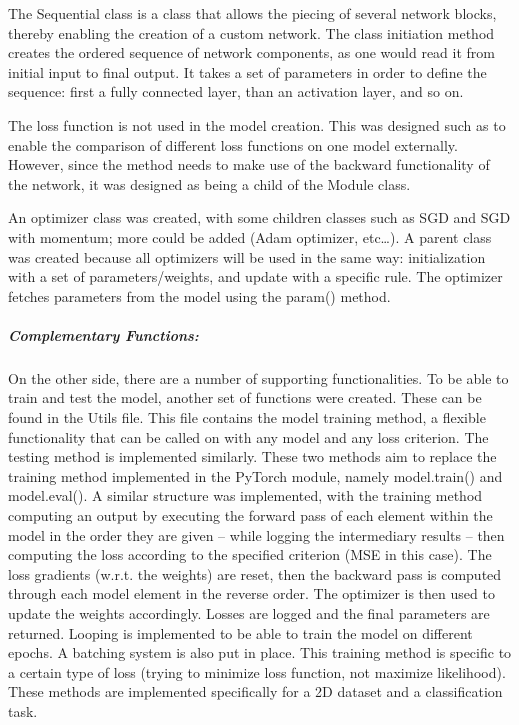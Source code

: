 \documentclass[10pt, a4paper]{article}
\begin{document}
The Sequential class is a class that allows the piecing of several network blocks, thereby enabling the creation of a custom network. The class initiation method creates the ordered sequence of network components, as one would read it from initial input to final output. It takes a set of parameters in order to define the sequence: first a fully connected layer, than an activation layer, and so on.

The loss function is not used in the model creation. This was designed such as to enable the comparison of different loss functions on one model externally. However, since the method needs to make use of the backward functionality of the network, it was designed as being a child of the Module class.

An optimizer class was created, with some children classes such as SGD and SGD with momentum; more could be added (Adam optimizer, etc…). A parent class was created because all optimizers will be used in the same way: initialization with a set of parameters/weights, and update with a specific rule. The optimizer fetches parameters from the model using the param() method.


\subparagraph{Complementary Functions:}
On the other side, there are a number of supporting functionalities. To be able to train and test the model, another set of functions were created. These can be found in the Utils file. This file contains the model training method, a flexible functionality that can be called on with any model and any loss criterion. The testing method is implemented similarly. These two methods aim to replace the training method implemented in the PyTorch module, namely model.train() and model.eval(). A similar structure was implemented, with the training method computing an output by executing the forward pass of each element within the model in the order they are given -- while logging the intermediary results -- then computing the loss according to the specified criterion (MSE in this case). The loss gradients (w.r.t. the weights) are reset, then the backward pass is computed through each model element in the reverse order. The optimizer is then used to update the weights accordingly. Losses are logged and the final parameters are returned. Looping is implemented to be able to train the model on different epochs. A batching system is also put in place. This training method is specific to a certain type of loss (trying to minimize loss function, not maximize likelihood). These methods are implemented specifically for a 2D dataset and a classification task.
\end{document}
